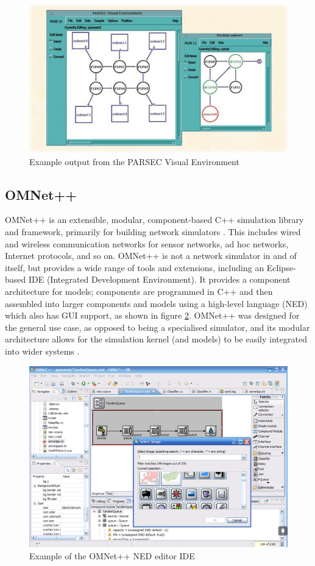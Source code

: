 \begin{figure}
\centering	
\includegraphics[scale=0.8]{img/pave}	
\caption{Example output from the PARSEC Visual Environment}
\label{pave}
\end{figure}

\subsection{OMNet++}
OMNet++ is an extensible, modular, component-based C++ simulation library and framework, primarily for building network simulators \cite{omnet2016}. This includes wired and wireless communication networks for sensor networks, ad hoc networks, Internet protocols, and so on. OMNet++ is not a network simulator in and of itself, but provides a wide range of tools and extensions, including an Eclipse-based IDE (Integrated Development Environment). It provides a component architecture for models; components are programmed in C++ and then assembled into larger components and models using a high-level language (NED) which also has GUI support, as shown in figure \ref{omnet}. OMNet++ was designed for the general use case, as opposed to being a specialised simulator, and its modular architecture allows for the simulation kernel (and models) to be easily integrated into wider systems \cite{varga2008}. 

\begin{figure}
\centering	
\includegraphics[scale=0.7]{img/omnet}	
\caption{Example of the OMNet++ NED editor IDE}
\label{omnet}
\end{figure}

